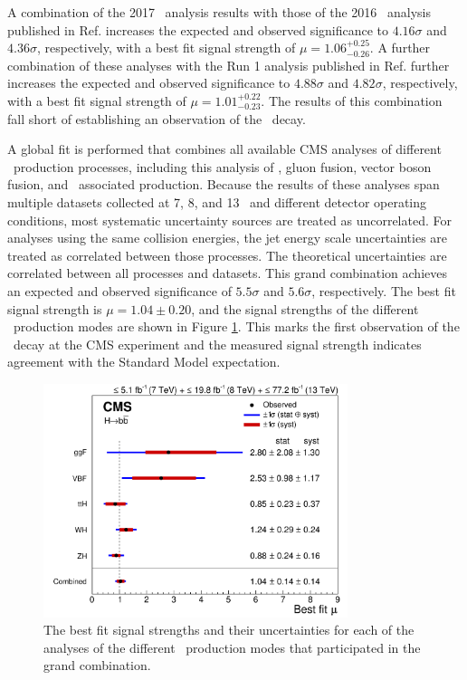 A combination of the 2017 \VHbb\ analysis results with those of the 2016 \VHbb\ analysis published in Ref. \cite{CMSVHbbEvidence} increases the expected and observed significance to $4.16\sigma$ and $4.36\sigma$, respectively, with a best fit signal strength of $\mu = 1.06_{-0.26}^{+0.25}$. A further combination of these analyses with the Run 1 analysis published in Ref. \cite{CMSVHbbRun1} further increases the expected and observed significance to $4.88\sigma$ and $4.82\sigma$, respectively, with a best fit signal strength of $\mu = 1.01_{-0.23}^{+0.22}$. The results of this combination fall short of establishing an observation of the \VHbb\ decay.

A global fit is performed that combines all available CMS analyses of different \Htobb\ production processes, including this analysis of \VHbb, gluon fusion\cite{ggHbb}, vector boson fusion\cite{VBF}, and \qrkt\qrktbar\ associated production\cite{CMSttH1,CMSttH2,CMSttH3}. Because the results of these analyses span multiple datasets collected at 7, 8, and 13 \TeV\ and different detector operating conditions, most systematic uncertainty sources are treated as uncorrelated. For analyses using the same collision energies, the jet energy scale uncertainties are treated as correlated between those processes. The theoretical uncertainties are correlated between all processes and datasets. This grand combination achieves an expected and observed significance of $5.5\sigma$ and $5.6\sigma$, respectively. The best fit signal strength is $\mu = 1.04 \pm 0.20$, and the signal strengths of the different \Htobb\ production modes are shown in Figure \ref{fig:MuHbb}. This marks the first observation of the \Htobb\ decay at the CMS experiment and the measured signal strength indicates agreement with the Standard Model expectation.

\begin{figure}[htbp]
  \centering
    \includegraphics[width=3.5in]{images/CMS-HIG-18-016_Figure_003}
    \caption[\Hbb\ Combination Signal Strengths]{The best fit signal strengths and their uncertainties for each of the analyses of the different \Htobb\ production modes that participated in the grand combination.}
    \label{fig:MuHbb}
\end{figure}
